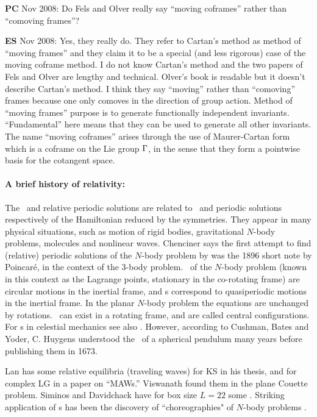 {{\bf PC} Nov 2008:
Do Fels and Olver really say
``moving coframes'' rather than ``comoving frames''?

{\bf ES}  Nov 2008: Yes, they really do. They refer to
Cartan's method as method of ``moving frames'' and they claim
it to be a special (and less rigorous) case of the moving
coframe method. I do not know Cartan's method and the two
papers of Fels and Olver are
lengthy and technical. Olver's book is readable but it
doesn't describe Cartan's method. I think they say ``moving''
rather than ``comoving'' frames because one only comoves in
the direction of group action.
Method of ``moving frames'' purpose is to generate
functionally independent invariants. ``Fundamental'' here means that they can be
used to generate all other invariants.
The name ``moving coframes'' arises through the use of
Maurer-Cartan form which is a coframe on the Lie group
$\Gamma$, in the sense that they form a pointwise basis for
the cotangent space.

    } %

\paragraph{A brief history of relativity:}\label{cont:rpoCond}
The \reqva\ and relative periodic solutions
are related to
\eqva\ and periodic solutions respectively
of the Hamiltonian reduced by the symmetries.
They appear in many physical situations,
such as motion of rigid bodies, gravitational
$N$-body problems, molecules and nonlinear waves.
Chenciner says
the first attempt to find (relative) periodic solutions of the
$N$-body problem by
was the 1896 short note by Poincar\'e,
in the context of the 3-body problem.
\Reqva\ of the $N$-body problem
(known in this context as the Lagrange points, stationary in
the co-rotating frame) are circular motions in the inertial frame,
and {\rpo s} correspond to quasiperiodic motions in the inertial frame.
In the planar $N$-body problem the equations are unchanged by
rotations. \Reqva\ can exist in a rotating frame,
and are called central configurations.
For \rpo s in celestial mechanics see also .
However, according to
Cushman, Bates and Yoder,
C. Huygens understood the \reqva\ of a
spherical pendulum many
years before publishing them in 1673.

Lan has some relative equilibria (traveling waves) for KS in his
thesis, %
 and for complex LG in a paper on ``MAWs.''
Viswanath %
found them in the plane Couette problem.
Siminos and Davidchack have for box size $L=22$ some \eqva.
Striking application of \rpo s has been the discovery
of ``choreographies" of $N$-body problems%
.
